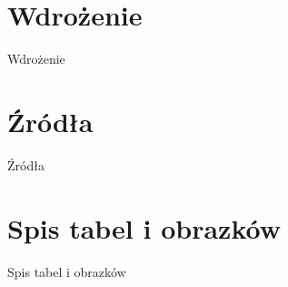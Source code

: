 \documentclass[12pt,a4paper]{article}
\begin{document}
	\section{Wdrożenie}
		\indent Wdrożenie
	\newpage
	
	\section{Źródła}
		\indent Źródła
	\newpage
	
	\section{Spis tabel i obrazków}
		\indent Spis tabel i obrazków
	\newpage
\end{document}
